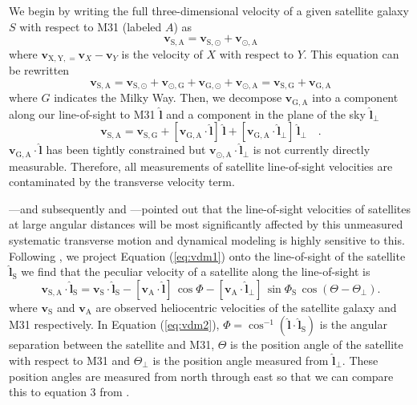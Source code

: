 \documentclass[preprint]{aastex}
\newcommand{\eqlabel}[1]{\label{eq:#1}}
\newcommand{\eq}[1]{Equation (\ref{eq:#1})}
\newcommand{\bvec}[1]{\ensuremath{\boldsymbol{#1}}}
\renewcommand{\vector}[1]{\ensuremath{\bvec{#1}}}
\newcommand{\vel}[1]{\ensuremath{\vector{v}_\mathrm{#1}}}
\newcommand{\vrel}[2]{\ensuremath{\vector{v}_{\mathrm{#1},\mathrm{#2}}}}
\newcommand{\los}{\ensuremath{\hat{\vector{l}}}}
\newcommand{\losperp}{\ensuremath{\hat{\vector{l}}_\perp}}
\newcommand{\lossat}{\ensuremath{\hat{\vector{l}}_\mathrm{S}}}
\newcommand{\angsep}{\ensuremath{\Phi}}
\newcommand{\posang}{\ensuremath{\Theta}}
\newcommand{\posangperp}{\ensuremath{\Theta_\perp}}
\begin{document}
We begin by writing the full three-dimensional velocity of a given satellite
galaxy $S$ with respect to M31 (labeled $A$) as
\begin{equation}
    \eqlabel{vdm1}
    \vrel{S}{A} = \vrel{S}{\odot} + \vrel{\odot}{A}
\end{equation}
where $\vrel{X,Y} = \vector{v}_{X}-\vector{v}_Y$ is the velocity of $X$
with respect to $Y$.  This equation can be rewritten
\begin{equation}
    \vrel{S}{A} = \vrel{S}{\odot}+\vrel{\odot}{G}+\vrel{G}{\odot}
                        +\vrel{\odot}{A}
               = \vrel{S}{G} + \vrel{G}{A}
\end{equation}
where $G$ indicates the Milky Way.  Then, we decompose $\vrel{G}{A}$
into a component along our line-of-sight to M31 $\los$ and a
component in the plane of the sky $\losperp$
\begin{equation}
    \vrel{S}{A} = \vrel{S}{G} + [\vrel{G}{A}\cdot\los] \, \los
        + [\vrel{G}{A}\cdot\losperp] \, \losperp \quad .
\end{equation}
$\vrel{G}{A}\cdot\los$ has been tightly
constrained \citep{Courteau:1999} but
$\vrel{\odot}{A}\cdot\losperp$ is not currently directly
measurable. Therefore, all measurements of satellite line-of-sight
velocities are contaminated by the transverse velocity term.

\citet{Bahcall:1981}---and subsequently \citet{ew} and \citet{vdm}---pointed
out that the line-of-sight velocities of satellites at large angular
distances will be most significantly affected by this unmeasured systematic
transverse motion and dynamical modeling is highly sensitive to this.
Following \citet{vdm}, we project \eq{vdm1}
onto the line-of-sight of the satellite $\lossat$ we find that the
peculiar velocity of a satellite along the line-of-sight is
\begin{equation}
    \eqlabel{vdm2}
    \vrel{S}{A}\cdot\lossat = \vel{S}\cdot\lossat
                - [ \vel{A}\cdot\los] \, \cos \angsep
                - [ \vel{A}\cdot\losperp] \,
        \sin \Phi_\mathrm{S} \, \cos \left ( \posang
            - \posangperp \right ).
\end{equation}
where $\vel{S}$ and $\vel{A}$ are observed heliocentric velocities of
the satellite galaxy and M31 respectively. In \eq{vdm2},
$\angsep = \cos^{-1} ( \los\cdot\lossat )$ is the angular separation
between the satellite and M31,
$\posang$ is the position angle of the satellite with respect to M31
and $\posangperp$ is the position angle measured from $\losperp$.
These position angles are measured from north through east so that we
can compare this to equation 3 from
\citet{vdm}.
\end{document}
